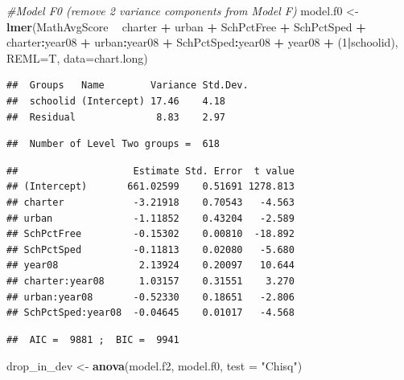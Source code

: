 \documentclass[
]{krantz}
\newenvironment{Shaded}{\begin{snugshade}}{\end{snugshade}}
\newcommand{\CommentTok}[1]{\textcolor[rgb]{0.37,0.37,0.37}{\textit{#1}}}
\newcommand{\DataTypeTok}[1]{\textcolor[rgb]{0.27,0.27,0.27}{#1}}
\newcommand{\DecValTok}[1]{\textcolor[rgb]{0.06,0.06,0.06}{#1}}
\newcommand{\KeywordTok}[1]{\textcolor[rgb]{0.27,0.27,0.27}{\textbf{#1}}}
\newcommand{\NormalTok}[1]{#1}
\newcommand{\OperatorTok}[1]{\textcolor[rgb]{0.43,0.43,0.43}{\textbf{#1}}}
\newcommand{\StringTok}[1]{\textcolor[rgb]{0.5,0.5,0.5}{#1}}
\begin{document}
\begin{Shaded}
\begin{Highlighting}[]
\CommentTok{#Model F0 (remove 2 variance components from Model F)}
\NormalTok{model.f0 <-}\StringTok{ }\KeywordTok{lmer}\NormalTok{(MathAvgScore }\OperatorTok{~}\StringTok{ }\NormalTok{charter }\OperatorTok{+}\StringTok{ }\NormalTok{urban }\OperatorTok{+}\StringTok{ }\NormalTok{SchPctFree }\OperatorTok{+}\StringTok{ }
\StringTok{  }\NormalTok{SchPctSped }\OperatorTok{+}\StringTok{ }\NormalTok{charter}\OperatorTok{:}\NormalTok{year08 }\OperatorTok{+}\StringTok{ }\NormalTok{urban}\OperatorTok{:}\NormalTok{year08 }\OperatorTok{+}\StringTok{ }
\StringTok{  }\NormalTok{SchPctSped}\OperatorTok{:}\NormalTok{year08 }\OperatorTok{+}\StringTok{ }\NormalTok{year08 }\OperatorTok{+}
\StringTok{  }\NormalTok{(}\DecValTok{1}\OperatorTok{|}\NormalTok{schoolid), }\DataTypeTok{REML=}\NormalTok{T, }\DataTypeTok{data=}\NormalTok{chart.long)}
\end{Highlighting}
\end{Shaded}

\begin{verbatim}
##  Groups   Name        Variance Std.Dev.
##  schoolid (Intercept) 17.46    4.18    
##  Residual              8.83    2.97
\end{verbatim}

\begin{verbatim}
##  Number of Level Two groups =  618
\end{verbatim}

\begin{verbatim}
##                    Estimate Std. Error  t value
## (Intercept)       661.02599    0.51691 1278.813
## charter            -3.21918    0.70543   -4.563
## urban              -1.11852    0.43204   -2.589
## SchPctFree         -0.15302    0.00810  -18.892
## SchPctSped         -0.11813    0.02080   -5.680
## year08              2.13924    0.20097   10.644
## charter:year08      1.03157    0.31551    3.270
## urban:year08       -0.52330    0.18651   -2.806
## SchPctSped:year08  -0.04645    0.01017   -4.568
\end{verbatim}

\begin{verbatim}
##  AIC =  9881 ;  BIC =  9941
\end{verbatim}

\begin{Shaded}
\begin{Highlighting}[]
\NormalTok{drop_in_dev <-}\StringTok{ }\KeywordTok{anova}\NormalTok{(model.f2, model.f0, }\DataTypeTok{test =} \StringTok{"Chisq"}\NormalTok{)}
\end{Highlighting}
\end{Shaded}
\end{document}
